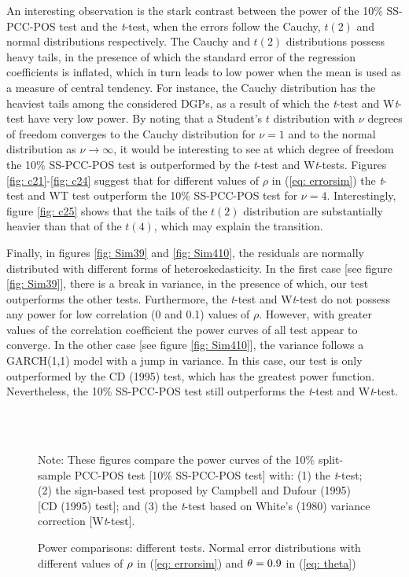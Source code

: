 \documentclass[harvard,11pt]{article}
\begin{document}
An interesting observation is the stark contrast between the power of the 10\% SS-PCC-POS test and the \textit{t}-test, when the errors follow the Cauchy, $t(2)$ and normal distributions respectively. The Cauchy and $t(2)$ distributions possess heavy tails, in the presence of which the standard error of the regression coefficients is inflated, which in turn leads to low power when the mean is used as a measure of central tendency. For instance, the Cauchy distribution has the heaviest tails among the considered  DGPs, as a result of which the \textit{t}-test and W\textit{t}-test have very low power. By noting that a Student's $t$ distribution with $\nu$ degrees of freedom converges to the Cauchy distribution for $\nu=1$ and to the normal distribution as $\nu\rightarrow \infty$, it would be interesting to see at which degree of freedom the 10\% SS-PCC-POS test is outperformed by the \textit{t}-test and W\textit{t}-tests.  Figures \ref{fig: c21}-\ref{fig: c24} suggest that for different values of $\rho$ in (\ref{eq: errorsim}) the \textit{t}-test and WT test outperform the 10\% SS-PCC-POS test for $\nu=4$. Interestingly, figure \ref{fig: c25} shows that the tails of the $t(2)$ distribution are substantially heavier than that of the $t(4)$, which may explain the transition.


Finally, in figures \ref{fig: Sim39} and \ref{fig: Sim410}, the residuals are normally distributed with different forms of heteroskedasticity. In the first case [see figure \ref{fig: Sim39}], there is a break in variance, in the presence of which, our test outperforms the other tests. Furthermore, the \textit{t}-test and W\textit{t}-test do not possess any power for low correlation (0 and 0.1) values of $\rho$. However, with greater values of the correlation coefficient the power curves of all test appear to converge. In the other case [see figure \ref{fig: Sim410}], the variance follows a GARCH(1,1) model with a jump in variance. In this case, our test is only outperformed by the CD (1995) test, which has the greatest power function. Nevertheless, the 10\% SS-PCC-POS test still outperforms the \textit{t}-test and W\textit{t}-test.  
\begin{figure}[tbph]
\caption{Power comparisons: different tests. Normal error distributions with
different values of $\protect\rho $ in (\protect\ref{eq: errorsim}) and $\protect%
\theta =0.9$ in (\protect\ref{eq: theta})}
\begin{center}
 \\[0pt]
\\[0pt]
\end{center}
\doublespacing
Note: These figures compare the power curves of the 10\% split-sample PCC-POS test
[10\% SS-PCC-POS test] with: (1) the \textit{t}-test; (2) the sign-based test
proposed by Campbell and Dufour (1995) [CD (1995) test]; and (3) the \textit{t}-test based
on White's (1980) variance correction [W\textit{t}-test]. 
\label{fig: Sim17}
\end{figure}
\end{document}
